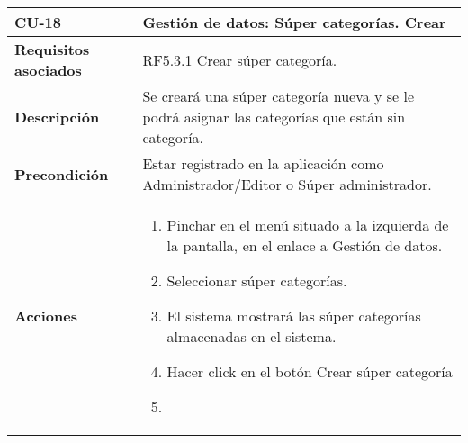 \newpage
\begin{longtable}[H]{@{}ll@{}}
\toprule
\begin{minipage}[b]{0.23\columnwidth}\raggedright\strut
\textbf{CU-18}\strut
\end{minipage} & \begin{minipage}[b]{0.71\columnwidth}\raggedright\strut
\textbf{Gestión de datos: Súper categorías. Crear}\strut
\end{minipage}\tabularnewline
\midrule
\endhead
\begin{minipage}[t]{0.23\columnwidth}\raggedright\strut
\textbf{Requisitos asociados}\strut
\end{minipage} & \begin{minipage}[t]{0.71\columnwidth}\raggedright\strut
RF5.3.1 Crear súper categoría.\strut
\end{minipage}\tabularnewline
\begin{minipage}[t]{0.23\columnwidth}\raggedright\strut
\textbf{Descripción}\strut
\end{minipage} & \begin{minipage}[t]{0.71\columnwidth}\raggedright\strut
Se creará una súper categoría nueva y se le podrá asignar las categorías que
están sin categoría.
\strut
\end{minipage}\tabularnewline
\begin{minipage}[t]{0.23\columnwidth}\raggedright\strut
\textbf{Precondición}\strut
\end{minipage} & \begin{minipage}[t]{0.71\columnwidth}\raggedright\strut
Estar registrado en la aplicación como Administrador/Editor o Súper administrador.\strut
\end{minipage}\tabularnewline
\begin{minipage}[t]{0.23\columnwidth}\raggedright\strut
\textbf{Acciones}\strut
\end{minipage} & \begin{minipage}[t]{0.71\columnwidth}\raggedright\strut
\begin{enumerate}
\def\labelenumi{\arabic{enumi}.}
\tightlist
\item
Pinchar en el menú situado a la izquierda de la pantalla, en el
enlace a Gestión de datos.
\item
Seleccionar súper categorías.
\item
El sistema mostrará las súper categorías almacenadas en el sistema.
\item
Hacer click en el botón Crear súper categoría
\item

\end{enumerate}
\end{minipage}
\end{longtable}
